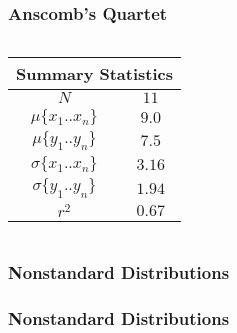 \begin{frame}
    \frametitle{Anscomb's Quartet}
    \begin{columns}
        \begin{column}{0.3\textwidth}
            \begin{center}
                \begin{tabular}{ c c }
                    \multicolumn{2}{c}{\textbf{Summary Statistics}} \\
                    \hline
                    $N$ & $11$ \\
                    $\mu\{x_1..x_n\}$ & $9.0$ \\
                    $\mu\{y_1..y_n\}$ & $7.5$ \\
                    $\sigma\{x_1..x_n\}$ & $3.16$ \\
                    $\sigma\{y_1..y_n\}$ & $1.94$ \\
                    $r^2$ & $0.67$
                \end{tabular}
            \end{center}
        \end{column}
        \begin{column}{0.7\textwidth}
            \begin{figure}[!h]
                \centering
                
            \end{figure}
        \end{column}
    \end{columns}
\end{frame}

\begin{frame}
    \frametitle{Nonstandard Distributions}
    \begin{figure}[!h]
        \centering
        
    \end{figure}
\end{frame}
\begin{frame}
    \frametitle{Nonstandard Distributions}
    \begin{figure}[!h]
        \centering
        
    \end{figure}
\end{frame}



